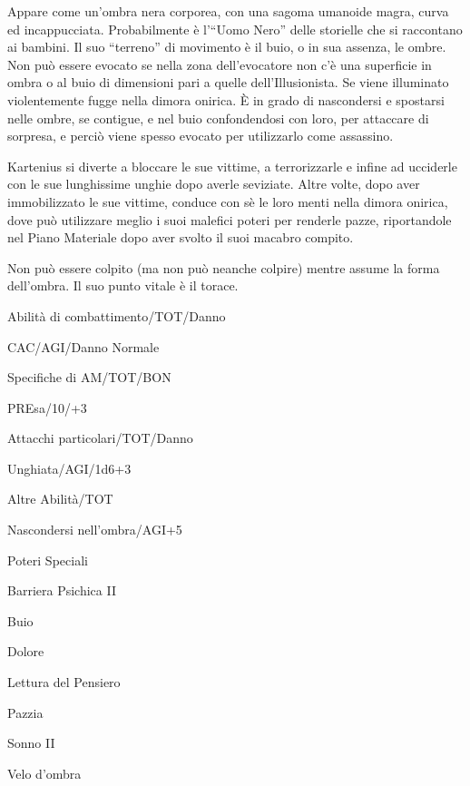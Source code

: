 Appare come un'ombra nera corporea, con una sagoma umanoide magra,
curva ed incappucciata. Probabilmente \`e l'``Uomo Nero'' delle
storielle che si raccontano ai bambini. Il suo ``terreno'' di
movimento \`e il buio, o in sua assenza, le ombre. Non pu\`o
essere evocato se nella zona dell'evocatore non c'\`e una superficie
in ombra o al buio di dimensioni pari a quelle dell'Illusionista.  Se
viene illuminato violentemente fugge nella dimora onirica. \`E in grado
di nascondersi e spostarsi nelle ombre, se contigue, e nel buio
confondendosi con loro, per attaccare di sorpresa, e perci\`o viene
spesso evocato per utilizzarlo come assassino.

Kartenius si diverte a bloccare le sue vittime, a terrorizzarle e
infine ad ucciderle con le sue lunghissime unghie dopo averle
seviziate. Altre volte, dopo aver immobilizzato le sue vittime,
conduce con s\`e le loro menti nella dimora onirica, dove pu\`o
utilizzare meglio i suoi malefici poteri per renderle pazze,
riportandole nel Piano Materiale dopo aver svolto il suoi macabro
compito.

Non pu\`o essere colpito (ma non pu\`o neanche colpire) mentre
assume la forma dell'ombra. Il suo punto vitale \`e il torace.


\begin{parmostro}{Abilit\`a di combattimento/TOT/Danno}
\item CAC/AGI/Danno Normale
\end{parmostro}

\begin{parmostro}{Specifiche di AM/TOT/BON}
\item PREsa/10/+3
\end{parmostro}

\begin{parmostro}{Attacchi particolari/TOT/Danno}
\item Unghiata/AGI/1d6+3
\end{parmostro}

\begin{parmostro}{Altre Abilit\`a/TOT}
\item Nascondersi nell'ombra/AGI+5
\end{parmostro}

\begin{parmostro}{Poteri Speciali}
\item Barriera Psichica II
\item Buio
\item Dolore
\item Lettura del Pensiero
\item Pazzia
\item Sonno II
\item Velo d'ombra
\end{parmostro}


